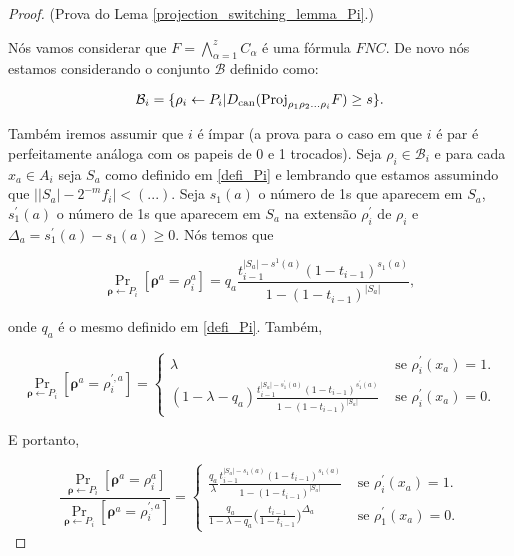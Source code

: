 \begin{proof} (Prova do Lema \ref{projection_switching_lemma_Pi}.)

	Nós vamos considerar que $F = \bigwedge_{\alpha = 1}^{z}C_{\alpha}$ é uma fórmula $FNC$. De novo nós estamos considerando o conjunto $\mathcal{B}$ definido como:
	
	\begin{equation*}
		\mathcal{B}_{i} = \{\rho_{i} \leftarrow P_{i} \lvert D_{\text{can}}(\text{Proj}_{\rho_{1}\rho_{2}\dots\rho_{i}}F) \geq s\}.
	\end{equation*}
	
	Também iremos assumir que $i$ é ímpar (a prova para o caso em que $i$ é par é perfeitamente análoga com os papeis de 0 e 1 trocados). Seja $\rho_{i} \in \mathcal{B}_{i}$ e para cada $x_{a} \in A_{i}$ seja $S_{a}$ como definido em \ref{defi_Pi} e lembrando que estamos assumindo que $\big\lvert \lvert S_{a} \rvert - 2^{-m}f_{i} \big\rvert < (...)$. Seja $s_{1}(a)$ o número de 1s que aparecem em $S_{a}$, $s_{1}^{\prime}(a)$ o número de 1s que aparecem em $S_{a}$ na extensão $\rho_{i}^{\prime}$ de $\rho_{i}$ e $\Delta_{a} = s_{1}^{\prime}(a) - s_{1}(a) \geq 0$. Nós temos que
	
	\begin{equation*}
		\Pr_{\boldsymbol{\rho} \leftarrow P_{i}}[\boldsymbol{\rho}^{a} = \rho_{i}^{a}] = q_{a}\frac{t_{i - 1}^{\lvert S_{a} \rvert - s^{1}(a)}(1 - t_{i - 1})^{s_{1}(a)}}{1 - (1 - t_{i - 1})^{\lvert S_{a} \rvert}},
	\end{equation*}

	onde $q_{a}$ é o mesmo definido em \ref{defi_Pi}. Também,
	
	\begin{equation*}
		\Pr_{\boldsymbol{\rho} \leftarrow P_{i}}[\boldsymbol{\rho}^{a} = \rho_{i}^{\prime, a}] = \begin{cases}
															         	\lambda & \text{ se } \rho_{i}^{\prime}(x_{a}) = 1. \\
															         	(1 - \lambda - q_{a})\frac{t_{i - 1}^{\lvert S_{a} \rvert - s_{1}^{\prime}(a)}(1 - t_{i - 1})^{s_{1}^{\prime}(a)}}{1 - (1 - t_{i - 1})^{\lvert S_{a} \rvert}} & \text{ se } \rho_{i}^{\prime}(x_{a}) = 0.
															         \end{cases}
	\end{equation*}

	E portanto,
	
	\begin{equation*}
		\frac{\Pr_{\boldsymbol{\rho} \leftarrow P_{i}}[\boldsymbol{\rho}^{a} = \rho_{i}^{a}]}{\Pr_{\boldsymbol{\rho} \leftarrow P_{i}}[\boldsymbol{\rho}^{a} = \rho_{i}^{\prime, a}]} = \begin{cases}
																														\frac{q_{a}}{\lambda}\frac{t_{i - 1}^{\lvert S_{a} \rvert - s_{1}(a)}(1 - t_{i - 1})^{s_{1}(a)}}{1 - (1 - t_{i - 1})^{\lvert S_{a} \rvert}} & \text{ se } \rho_{i}^{\prime}(x_{a}) = 1. \\
																														\frac{q_{a}}{1 - \lambda - q_{a}} \bigg( \frac{t_{i - 1}}{1 - t_{i - 1}}\bigg)^{\Delta_{a}} & \text{ se } \rho_{1}^{\prime}(x_{a}) = 0.
																													    \end{cases}
	\end{equation*}


\end{proof}
